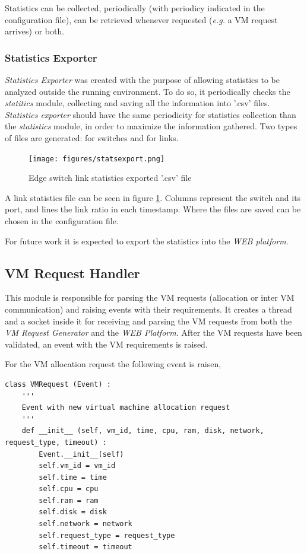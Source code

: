 \documentclass[12pt,english,oneside]{book}
\begin{document}
Statistics can be collected, periodically (with periodicy indicated in the configuration file), can be retrieved whenever requested (\textit{e.g.} a VM request arrives) or both.

\subsubsection{Statistics Exporter}
\hspace{0.6cm}

\textit{Statistics Exporter} was created with the purpose of allowing statistics to be analyzed outside the running environment.
To do so, it periodically checks the \textit{statitics} module, collecting and saving all the information into '.csv' files.
\textit{Statistics exporter} should have the same periodicity for statistics collection than the \textit{statistics} module, in order to maximize the information gathered.
Two types of files are generated: for switches and for links.

\begin{figure}[h!tbp]
        \centering
        \texttt{[image: figures/statsexport.png]}
        \caption{Edge switch link statistics exported '.csv' file}
        \label{fig:statsexport}
\end{figure}

A link statistics file can be seen in figure \ref{fig:statsexport}. Columns represent the switch and its port, and lines the link ratio in each timestamp.
Where the files are saved can be chosen in the configuration file.

For future work it is expected to export the statistics into the \textit{WEB platform}.

\subsection{VM Request Handler}
\hspace{0.6cm}

This module is responsible for parsing the VM requests (allocation or inter VM communication) and raising events with their requirements.
It creates a thread and a socket inside it for receiving and parsing the VM requests from both the \textit{VM Request Generator} and the \textit{WEB Platform}.
After the VM requests have been validated, an event with the VM requirements is raised.

For the VM allocation request the following event is raisen,

\begin{verbatim}
class VMRequest (Event) :
    '''
    Event with new virtual machine allocation request
    '''
    def __init__ (self, vm_id, time, cpu, ram, disk, network, request_type, timeout) :
        Event.__init__(self)
        self.vm_id = vm_id
        self.time = time
        self.cpu = cpu
        self.ram = ram
        self.disk = disk
        self.network = network
        self.request_type = request_type
        self.timeout = timeout
\end{verbatim}
\end{document}
